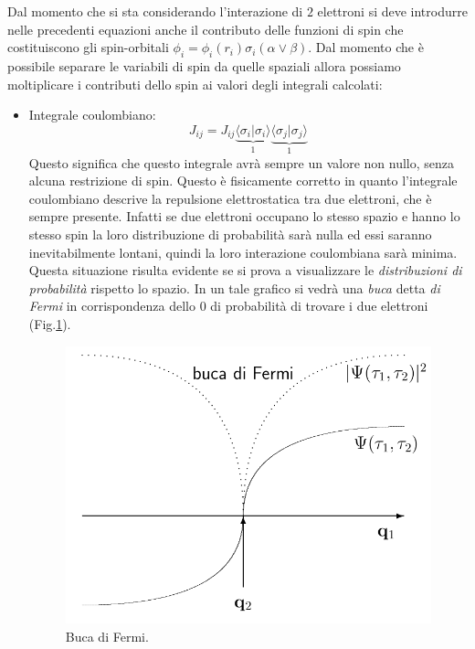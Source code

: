 \documentclass[oneside]{amsbook}
\numberwithin{section}{chapter}
\numberwithin{equation}{section}
\numberwithin{figure}{section}
\begin{document}
Dal momento che si sta considerando l'interazione di $2$ elettroni si deve introdurre nelle precedenti equazioni anche il contributo delle funzioni di spin che costituiscono gli spin-orbitali $\phi_i=\phi_i(r_i)\sigma_i(\alpha \vee \beta)$. Dal momento che è possibile separare le variabili di spin da quelle spaziali allora possiamo moltiplicare i contributi dello spin ai valori degli integrali calcolati:
\begin{itemize}
\item Integrale coulombiano:
\begin{equation}
J_{ij}=J_{ij} \underbrace{\langle\sigma_i\vert\sigma_i\rangle}_1 \underbrace{\langle\sigma_j\vert\sigma_j\rangle}_1
\end{equation}
Questo significa che questo integrale avrà sempre un valore non nullo, senza alcuna restrizione di spin. Questo è fisicamente corretto in quanto l'integrale coulombiano descrive la repulsione elettrostatica tra due elettroni, che è sempre presente. Infatti se due elettroni occupano lo stesso spazio e hanno lo stesso spin la loro distribuzione di probabilità sarà nulla ed essi saranno inevitabilmente lontani, quindi la loro interazione coulombiana sarà minima. Questa situazione risulta evidente se si prova a visualizzare le \emph{distribuzioni di probabilità} rispetto lo spazio. In un tale grafico si vedrà una \emph{buca} detta \emph{di Fermi} in corrispondenza dello $0$ di probabilità di trovare i due elettroni (Fig.\ref{Fer}).


\begin{figure}[H]
\centering
\caption{Buca di Fermi.}\label{Fer}
\includegraphics[scale=0.3]{fer}
\end{figure}


\end{itemize}
\end{document}

